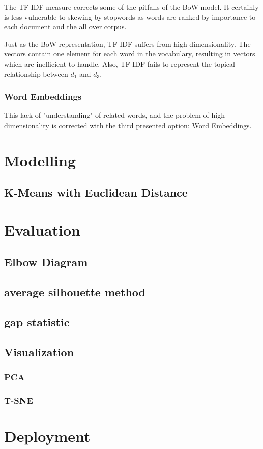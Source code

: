 		The \ac{TF-IDF} measure corrects some of the pitfalls of the \ac{BoW} model. It certainly is less vulnerable to skewing by stopwords as words are ranked by importance to each document and the all over corpus. 
		
		Just as the \ac{BoW} representation, \ac{TF-IDF} suffers from high-dimensionality. The vectors contain one element for each word in the vocabulary, resulting in vectors which are inefficient to handle.
		Also, \ac{TF-IDF} fails to represent the topical relationship between $ d_{1} $ and $ d_{3}$. 
		
		\subsubsection{Word Embeddings}
		This lack of "understanding" of related words, and the problem of high-dimensionality is corrected with the third presented option: Word Embeddings.


\section{Modelling}
	\subsection{K-Means with Euclidean Distance}
\section{Evaluation}
	\subsection{Elbow Diagram}
	\subsection{average silhouette method}
	\subsection{gap statistic}
	\subsection{Visualization}
		\subsubsection{PCA}
		\subsubsection{T-SNE}
\section{Deployment}
